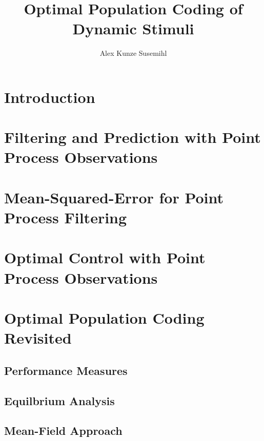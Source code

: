 \documentclass[justified,notitlepage]{tufte-book}
\title{Optimal Population Coding of Dynamic Stimuli}
\author{Alex Kunze Susemihl}
\begin{document}
\maketitle
\setcounter{secnumdepth}{1}
\tableofcontents
\chapter{Introduction}



\chapter{Filtering and Prediction with Point Process Observations}

\label{chap:filtering}



\chapter{Mean-Squared-Error for Point Process Filtering}

\label{chap:MSE}



\chapter{Optimal Control with Point Process Observations}

\label{chap:control}



\chapter{Optimal Population Coding Revisited}

\label{chap:optimal}

\section{Performance Measures}

\section{Equilbrium Analysis}

\section{Mean-Field Approach}
\end{document}
